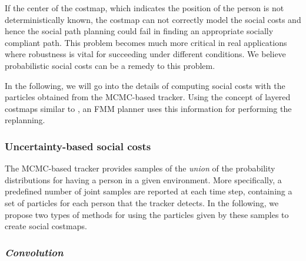 If the center of the costmap, which indicates the position of the person is not deterministically known, the costmap can not correctly model the social costs and hence the social path planning could fail in finding an appropriate socially compliant path. This problem becomes much more critical in real applications where robustness is vital for succeeding under different conditions. We believe probabilistic social costs can be a remedy to this problem. 


In the following, we will go into the details of computing social costs with the particles obtained from the MCMC-based tracker. Using the concept of layered costmaps similar to \cite{lu2014iros}, an FMM planner uses this information for performing the replanning.%
\subsubsection{Uncertainty-based social costs}

The MCMC-based tracker provides samples of the \textit{union} of the probability distributions for having a person in a given environment. More specifically, a predefined number of joint samples are reported at each time step, containing a set of particles for each person that the tracker detects. In the following, we propose two types of methods for using the particles given by these samples to create social costmaps.  


\subsubsection*{\normalfont \textit{Convolution}}

